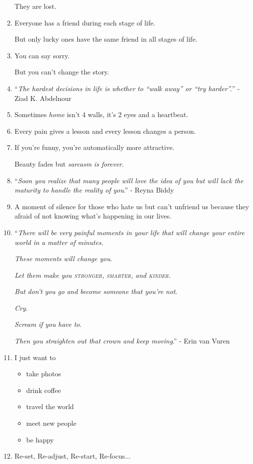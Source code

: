 \documentclass{article}
\begin{document}
\begin{enumerate}
	They are lost.
	\item Everyone has a friend during each stage of life.
	
	But only lucky ones have the same friend in all stages of life.
	\item You can say sorry.
	
	But you can't change the story.
	\item ``\textit{The hardest decisions in life is whether to ``walk away'' or ``try harder''.}'' - Ziad K. Abdelnour
	\item Sometimes \textit{home} isn't 4 walls, it's 2 eyes and a heartbeat.
	\item Every pain gives a lesson and every lesson changes a person.
	\item If you're funny, you're automatically more attractive.
	
	Beauty fades but \textit{sarcasm is forever}.
	\item ``\textit{Soon you realize that many people will love the idea of you but will lack the maturity to handle the reality of you}.'' - Reyna Biddy
	\item A moment of silence for those who hate us but can't unfriend us because they afraid of not knowing what's happening in our lives.
	\item ``\textit{There will be very painful moments in your life that will change your entire world in a matter of minutes.}
	
	\textit{These moments will change you}.
	
	\textit{Let them make you \textsc{stronger, smarter}, and \textsc{kinder}.}
	
	\textit{But don't you go and become someone that you're not}.
	
	\textit{Cry}.
	
	\textit{Scream if you have to}.
	
	\textit{Then you straighten out that crown and keep moving}.'' - Erin van Vuren
	\item I just want to
	\begin{itemize}
		\item take photos
		\item drink coffee
		\item travel the world
		\item meet new people
		\item be happy
	\end{itemize}
	\item Re-set, Re-adjust, Re-start, Re-focus$\ldots$
	

\end{enumerate}
\end{document}
